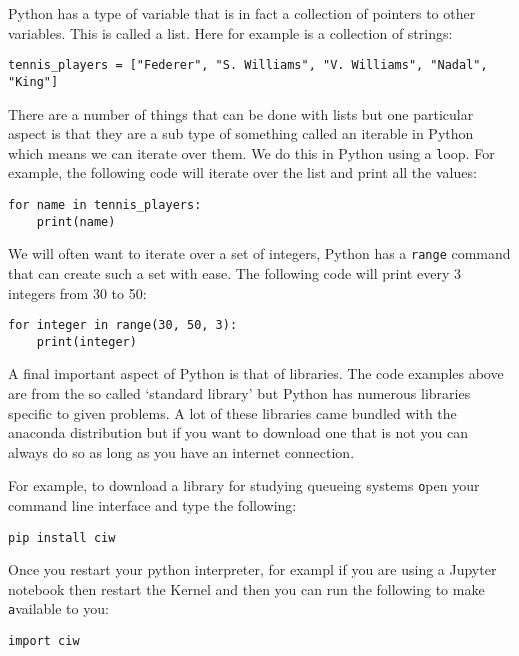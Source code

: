 Python has a type of variable that is in fact a collection of pointers to other
variables. This is called a list. Here for example is a collection of strings:

\begin{verbatim}
tennis_players = ["Federer", "S. Williams", "V. Williams", "Nadal", "King"]
\end{verbatim}

There are a number of things that can be done with lists but one particular
aspect is that they are a sub type of something called an iterable in Python
which means we can iterate over them. We do this in Python using a
\texttt loop. For example, the following code will iterate over the
list and print all the values:

\begin{verbatim}
for name in tennis_players:
    print(name)
\end{verbatim}

We will often want to iterate over a set of integers, Python has a
\texttt{range} command that can create such a set with ease. The following
code will print every 3 integers from 30 to 50:


\begin{verbatim}
for integer in range(30, 50, 3):
    print(integer)
\end{verbatim}

A final important aspect of Python is that of libraries. The code examples above
are from the so called `standard library' but Python has numerous libraries
specific to given problems. A lot of these libraries came bundled with the
anaconda distribution but if you want to download one that is not you can always
do so as long as you have an internet connection.

For example, to download a library for studying queueing systems
\texttt open your command line interface and type the following:

\begin{verbatim}
pip install ciw
\end{verbatim}

Once you restart your python interpreter, for exampl if you are using a Jupyter
notebook then restart the Kernel and then you can run the following to make
\texttt available to you:

\begin{verbatim}
import ciw
\end{verbatim}

